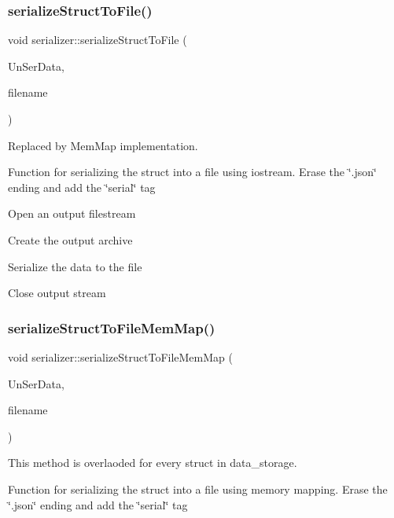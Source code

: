 \subsubsection{\texorpdfstring{serialize\+Struct\+To\+File()}{serializeStructToFile()}}
{\footnotesize\ttfamily void serializer\+::serialize\+Struct\+To\+File (\begin{DoxyParamCaption}\item[{\hyperlink{structUMGR__s}{U\+M\+G\+R\+\_\+s}}]{Un\+Ser\+Data,  }\item[{string}]{filename }\end{DoxyParamCaption})}



Replaced by Mem\+Map implementation. 

Function for serializing the struct into a file using iostream. Erase the \char`\"{}.\+json\char`\"{} ending and add the \char`\"{}serial\char`\"{} tag

Open an output filestream

Create the output archive

Serialize the data to the file

Close output stream \mbox{\label{classserializer_a452477e4c216e38170128ae322bda7f9}} 
\subsubsection{\texorpdfstring{serialize\+Struct\+To\+File\+Mem\+Map()}{serializeStructToFileMemMap()}\hspace{0.1cm}{\footnotesize\ttfamily [1/2]}}
{\footnotesize\ttfamily void serializer\+::serialize\+Struct\+To\+File\+Mem\+Map (\begin{DoxyParamCaption}\item[{\hyperlink{structUMGR__s}{U\+M\+G\+R\+\_\+s}}]{Un\+Ser\+Data,  }\item[{string}]{filename }\end{DoxyParamCaption})}



This method is overlaoded for every struct in data\+\_\+storage. 

Function for serializing the struct into a file using memory mapping. Erase the \char`\"{}.\+json\char`\"{} ending and add the \char`\"{}serial\char`\"{} tag

